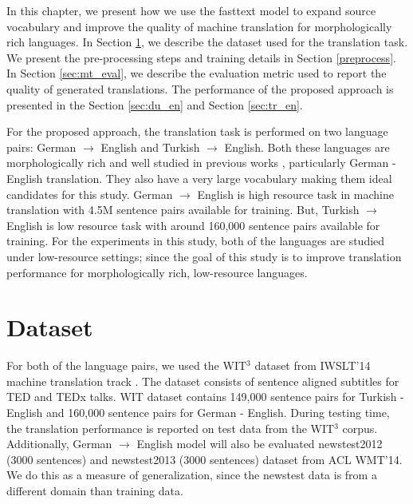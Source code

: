 In this chapter, we present how we use the fasttext model to expand source vocabulary and improve the quality of machine translation for morphologically rich languages. In Section \ref{sec:mtdataset}, we describe the dataset used for the translation task. We present the pre-processing steps and training details in Section \ref{preprocess}. In Section \ref{sec:mt_eval}, we describe the evaluation metric used to report the quality of generated translations. The performance of the proposed approach is presented in the Section \ref{sec:du_en} and Section \ref{sec:tr_en}. 

For the proposed approach, the translation task is performed on two language pairs: German $\rightarrow$ English and Turkish $\rightarrow$ English. Both these languages are morphologically rich and well studied in previous works \citep{bahdanau2014neural,luong2015effective,sennrich2015neural,gulcehre2015using}, particularly German - English translation. They also have a very large vocabulary making them ideal candidates for this study. German $\rightarrow$ English is high resource task in machine translation with 4.5M sentence pairs available for training. But, Turkish $\rightarrow$ English is low resource task with around 160,000 sentence pairs available for training. For the experiments in this study, both of the languages are studied under low-resource settings; since the goal of this study is to improve translation performance for morphologically rich, low-resource languages.





\section{Dataset }
\label{sec:mtdataset}

For both of the language pairs, we used the WIT$^{3}$ dataset \citep{cettolo2012wit3} from IWSLT'14 machine translation track \citep{cettolo2014report}. The dataset consists of sentence aligned subtitles for TED and TEDx talks. WIT dataset contains 149,000 sentence pairs for Turkish - English and 160,000 sentence pairs for German - English. During testing time, the translation performance is reported on test data from the WIT$^{3}$ corpus. Additionally, German $\rightarrow$ English model will also be evaluated newstest2012 (3000 sentences) and newstest2013 (3000 sentences) dataset from ACL WMT'14. We do this as a measure of generalization, since the newstest data is from a different domain than training data. 

